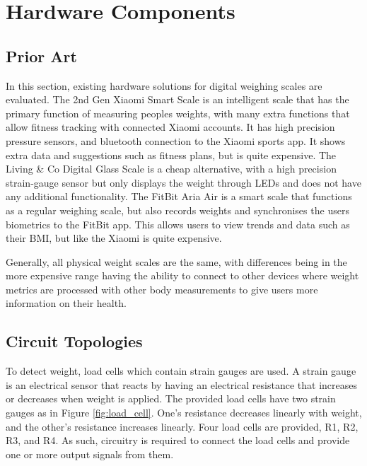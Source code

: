 
\chapter{Hardware Components}

\section{Prior Art}

In this section, existing hardware solutions for digital weighing scales are evaluated. 
The 2nd Gen Xiaomi Smart Scale is an intelligent scale that has the primary function of measuring peoples weights, with many extra functions that allow fitness tracking with connected Xiaomi accounts. It has high precision pressure sensors, and bluetooth connection to the Xiaomi sports app. It shows extra data and suggestions such as fitness plans, but is quite expensive. The Living \& Co Digital Glass Scale is a cheap alternative, with a high precision strain-gauge sensor but only displays the weight through LEDs and does not have any additional functionality. The FitBit Aria Air is a smart scale that functions as a regular weighing scale, but also records weights and synchronises the users biometrics to the FitBit app. This allows users to view trends and data such as their BMI, but like the Xiaomi is quite expensive.

Generally, all physical weight scales are the same, with differences being in the more expensive range having the ability to connect to other devices where weight metrics are processed with other body measurements to give users more information on their health. 




\section{Circuit Topologies}


To detect weight, load cells which contain strain gauges are used. A strain gauge is an electrical sensor that reacts by having an electrical resistance that increases or decreases when weight is applied. The provided load cells have two strain gauges as in Figure \ref{fig:load_cell}. One’s resistance decreases linearly with weight, and the other’s resistance increases linearly. Four load cells are provided, R1, R2, R3, and R4. As such, circuitry is required to connect the load cells and provide one or more output signals from them. 


